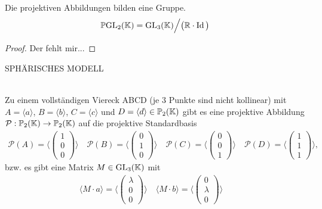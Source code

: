   \begin{thm} Die projektiven Abbildungen bilden eine Gruppe.
    \begin{align*}
      \mathbb{P} \mbox{GL}_2(\mathbb K) = \mbox{GL}_3(\mathbb K) \Big/ \big( \mathbb R \cdot \operatorname{Id} \big)
    \end{align*}
  \end{thm}

  \begin{proof}
    Der fehlt mir...
  \end{proof}

  SPHÄRISCHES MODELL

  \begin{thm}  \ \\
    Zu einem vollständigen Viereck ABCD (je $3$ Punkte sind nicht kollinear) mit $A=\langle a \rangle$, $B=\langle b \rangle$,
    $C=\langle c \rangle$ und $D=\langle d \rangle \in \mathbb{P}_2(\mathbb K)$ gibt es eine projektive Abbildung
    $\mathcal P: \mathbb{P}_2(\mathbb K) \rightarrow \mathbb{P}_2(\mathbb K)$ auf die projektive Standardbasis
    \begin{align*}
      \mathcal{P}(A) = \langle \begin{pmatrix} 1 \\ 0 \\ 0 \end{pmatrix} \rangle \quad
      \mathcal{P}(B) = \langle \begin{pmatrix} 0 \\ 1 \\ 0 \end{pmatrix} \rangle \quad
      \mathcal{P}(C) = \langle \begin{pmatrix} 0 \\ 0 \\ 1 \end{pmatrix} \rangle \quad
      \mathcal{P}(D) = \langle \begin{pmatrix} 1 \\ 1 \\ 1 \end{pmatrix} \rangle ,
    \end{align*}
    bzw. es gibt eine Matrix $M\in \mbox{GL}_3(\mathbb K)$ mit
    \begin{align*}
      \langle M \cdot a \rangle = \langle \begin{pmatrix} \lambda \\ 0 \\ 0 \end{pmatrix} \rangle \quad
      \langle M \cdot b \rangle = \langle \begin{pmatrix} 0 \\ \lambda \\ 0 \end{pmatrix} \rangle \quad

\end{align*}
\end{thm}
